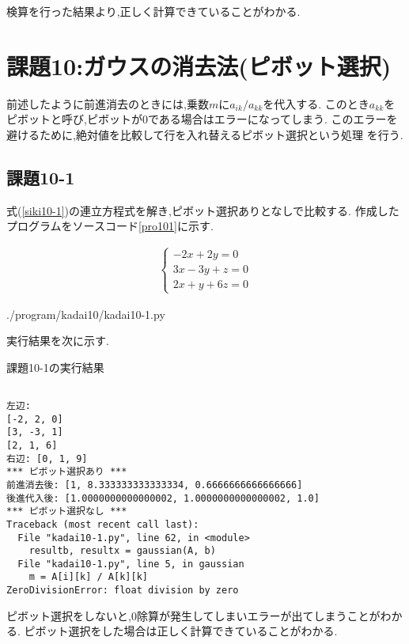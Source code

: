 \documentclass[a4j]{jsarticle}
\begin{document}
検算を行った結果より,正しく計算できていることがわかる.

\section{課題10:ガウスの消去法(ピボット選択)}
前述したように前進消去のときには,乗数$m$に$a_{ik}/a_{kk}$を代入する.
このとき$a_{kk}$をピボットと呼び,ピボットが0である場合はエラーになってしまう.
このエラーを避けるために,絶対値を比較して行を入れ替えるピボット選択という処理
を行う.

\subsection{課題10-1}
式(\ref{siki10-1})の連立方程式を解き,ピボット選択ありとなしで比較する.
作成したプログラムをソースコード\ref{pro101}に示す.

\begin{eqnarray}
 \begin{cases}
  -2x + 2y      = 0\\
  3x  - 3y +  z = 0\\
  2x  +  y + 6z = 0
 \end{cases}
 \label{siki10-1}
\end{eqnarray}

{./program/kadai10/kadai10-1.py}

実行結果を次に示す.
\begin{breakitembox}[l]{課題10-1の実行結果}
\begin{verbatim}
	
左辺:	
[-2, 2, 0]
[3, -3, 1]
[2, 1, 6]
右辺: [0, 1, 9]
*** ピボット選択あり ***
前進消去後: [1, 8.333333333333334, 0.6666666666666666]
後進代入後: [1.0000000000000002, 1.0000000000000002, 1.0]
*** ピボット選択なし ***
Traceback (most recent call last):
  File "kadai10-1.py", line 62, in <module>
    resultb, resultx = gaussian(A, b)
  File "kadai10-1.py", line 5, in gaussian
    m = A[i][k] / A[k][k]
ZeroDivisionError: float division by zero
\end{verbatim}
\end{breakitembox}

ピボット選択をしないと,0除算が発生してしまいエラーが出てしまうことがわかる.
ピボット選択をした場合は正しく計算できていることがわかる.
\end{document}
